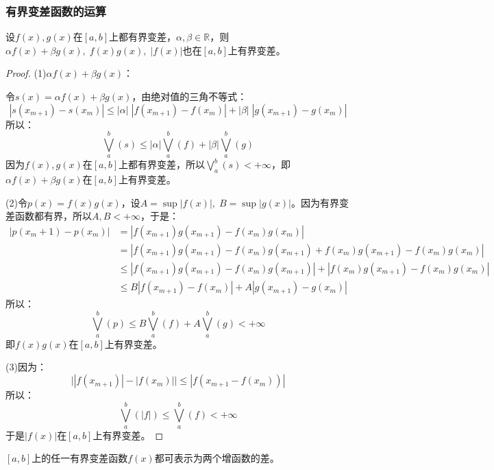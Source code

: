 \subsubsection{有界变差函数的运算}
\begin{theorem}
	设$f(x),g(x)$在$[a,b]$上都有界变差，$\alpha,\beta\in\mathbb{R}$，则$\alpha f(x)+\beta g(x),\;f(x)g(x),\;|f(x)|$也在$[a,b]$上有界变差。
\end{theorem}
\begin{proof}
	(1)$\alpha f(x)+\beta g(x)$：\par
	令$s(x)=\alpha f(x)+\beta g(x)$，由绝对值的三角不等式：
	\begin{equation*}
		|s(x_{m+1})-s(x_m)|\leqslant|\alpha|\;|f(x_{m+1})-f(x_m)|+|\beta|\;|g(x_{m+1})-g(x_m)|
	\end{equation*}
	所以：
	\begin{equation*}
		\bigvee_{a}^{b}(s)\leqslant|\alpha|\bigvee_{a}^{b}(f)+|\beta|\bigvee_{a}^{b}(g)
	\end{equation*}
	因为$f(x),g(x)$在$[a,b]$上都有界变差，所以$\bigvee_{a}^{b}(s)<+\infty$，即$\alpha f(x)+\beta g(x)$在$[a,b]$上有界变差。\par
	(2)令$p(x)=f(x)g(x)$，设$A=\sup|f(x)|,\;B=\sup|g(x)|$。因为有界变差函数都有界，所以$A,B<+\infty$，于是：
	\begin{align*}
		|p(x_m+1)-p(x_m)|
		&=|f(x_{m+1})g(x_{m+1})-f(x_m)g(x_m)| \\
		&=|f(x_{m+1})g(x_{m+1})-f(x_m)g(x_{m+1})+f(x_m)g(x_{m+1})-f(x_m)g(x_m)| \\
		&\leqslant|f(x_{m+1})g(x_{m+1})-f(x_m)g(x_{m+1})|+|f(x_m)g(x_{m+1})-f(x_m)g(x_m)| \\
		&\leqslant B|f(x_{m+1})-f(x_m)|+A|g(x_{m+1})-g(x_m)|
	\end{align*}
	所以：
	\begin{equation*}
		\bigvee_{a}^{b}(p)\leqslant B\bigvee_{a}^{b}(f)+A\bigvee_{a}^{b}(g)<+\infty
	\end{equation*}
	即$f(x)g(x)$在$[a,b]$上有界变差。\par
	(3)因为：
	\begin{equation*}
		\Big||f(x_{m+1})|-|f(x_m)|\Big|\leqslant|f(x_{m+1}-f(x_m))|
	\end{equation*}
	所以：
	\begin{equation*}
		\bigvee_{a}^{b}(|f|)\leqslant\bigvee_{a}^{b}(f)<+\infty
	\end{equation*}
	于是$|f(x)|$在$[a,b]$上有界变差。
\end{proof}
\begin{theorem}[Jordan分解定理]
	$[a,b]$上的任一有界变差函数$f(x)$都可表示为两个增函数的差。
\end{theorem}
